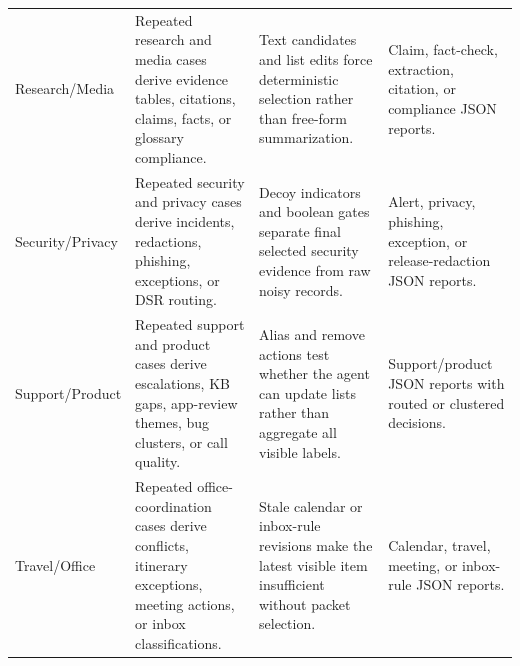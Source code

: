 \documentclass[11pt]{article}
\begin{document}
\begin{longtable}{L{0.18\textwidth}L{0.24\textwidth}L{0.27\textwidth}L{0.23\textwidth}}
Research/Media & Repeated research and media cases derive evidence tables, citations, claims, facts, or glossary compliance. & Text candidates and list edits force deterministic selection rather than free-form summarization. & Claim, fact-check, extraction, citation, or compliance JSON reports. \\
Security/Privacy & Repeated security and privacy cases derive incidents, redactions, phishing, exceptions, or DSR routing. & Decoy indicators and boolean gates separate final selected security evidence from raw noisy records. & Alert, privacy, phishing, exception, or release-redaction JSON reports. \\
Support/Product & Repeated support and product cases derive escalations, KB gaps, app-review themes, bug clusters, or call quality. & Alias and remove actions test whether the agent can update lists rather than aggregate all visible labels. & Support/product JSON reports with routed or clustered decisions. \\
Travel/Office & Repeated office-coordination cases derive conflicts, itinerary exceptions, meeting actions, or inbox classifications. & Stale calendar or inbox-rule revisions make the latest visible item insufficient without packet selection. & Calendar, travel, meeting, or inbox-rule JSON reports. \\
\bottomrule
\end{longtable}
\endgroup
\end{document}
